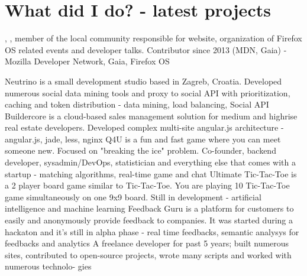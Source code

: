 \documentclass[11pt]{moderncv}
\begin{document}
	\maketitle
  \section{What did I do? {\color{gray}\scriptsize{- latest projects}}}
  {}{}{}
					{
            ,
            ,
            member of the local community responsible for website, organization of
            Firefox OS related events and developer talks. Contributor since
            2013 (MDN, Gaia)
          }
          {- Mozilla Developer Network, Gaia, Firefox OS}

					{} {} {}
					{Neutrino is a small development studio based in Zagreb, Croatia.
            Developed numerous social data mining tools and proxy to social API
          with prioritization, caching and token distribution}
        {- data mining, load balancing, Social API}
					{} {} {}
          {Buildercore is a cloud-based sales management solution for medium
            and highrise real estate developers. Developed complex multi-site
            angular.js architecture}
					{- angular.js, jade, less, nginx}
					{} {} {}
          {Q4U is a fun and fast game where you can meet someone new. Focused
            on "breaking the ice" problem. Co-founder, backend developer,
            sysadmin/DevOps, statistician and everything else that comes with a
          startup}
					{- matching algorithms, real-time game and chat}
      {}{}{}
      {Ultimate Tic-Tac-Toe is a 2 player board game similar to Tic-Tac-Toe.
        You are playing 10 Tic-Tac-Toe game simultaneously on one 9x9 board.
        Still in development}
      {- artificial intelligence and machine learning}
      {}{}{}
      {
        Feedback Guru is a platform for customers to easily and anonymously provide
        feedback to companies. It was started during a hackaton and it’s still in alpha phase}
      {- real time feedbacks, semantic analysys for feedbacks and analytics}
      {}{}{}
      {
      A freelance developer for past 5 years; built numerous sites, contributed to
      open-source projects, wrote many scripts and worked with numerous technolo-
      gies}{}
\end{document}
